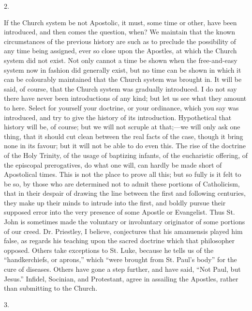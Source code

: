 2.

If the Church system be not Apostolic, it must, some time or other,
have been introduced, and then comes the question, when? We maintain
that the known circumstances of the previous history are such as to
preclude the possibility of any time being assigned, ever so close
upon the Apostles, at which the Church system did not exist. Not only
cannot a time be shown when the free-and-easy system now in fashion
did generally exist, but no time can be shown in which it can be
colourably maintained that the Church system was brought in. It will
be said, of course, that the Church system was gradually introduced. I
do not say there have never been introductions of any kind; but let us
see what they amount to here. Select for yourself your doctrine, or
your ordinance, which you say was introduced, and try to give the
history of its introduction. Hypothetical that history will be, of
course; but we will not scruple at that;—we will only ask one thing,
that it should cut clean between the real facts of the case, though it
bring none in its favour; but it will not be able to do even
this. The rise of the doctrine of the Holy Trinity, of the usage of
baptizing infants, of the eucharistic offering, of the episcopal
prerogatives, do what one will, can hardly be made short of
Apostolical times. This is not the place to prove all this; but so
fully is it felt to be so, by those who are determined not to admit
these portions of Catholicism, that in their despair of drawing the
line between the first and following centuries, they make up their
minds to intrude into the first, and boldly pursue their supposed
error into the very presence of some Apostle or Evangelist. Thus St.
John is sometimes made the voluntary or involuntary originator of some
portions of our creed. Dr. Priestley, I believe, conjectures that his
amanuensis played him false, as regards his teaching upon the sacred
doctrine which that philosopher opposed. Others take exceptions to St.
Luke, because he tells us of the ``handkerchiefs, or aprons,''
which ``were brought from St. Paul's body'' for the cure of
diseases. Others have gone a step further, and have said, ``Not
Paul, but Jesus.'' Infidel, Socinian, and Protestant, agree in
assailing the Apostles, rather than submitting to the Church.

3.

